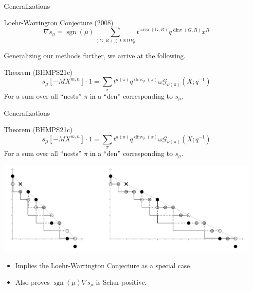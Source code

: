 \documentclass{beamer}
\DeclareMathOperator{\area}{area}
\DeclareMathOperator{\dinv}{dinv}
\newcommand{\Gcal}{\mathcal{G}}
\DeclareMathOperator{\sgn}{sgn}
\newcounter{c}
\begin{document}
\begin{frame}{Generalizations}
  \begin{block}{Loehr-Warrington Conjecture (2008)}
    \[\nabla s_\mu = \sgn(\mu)\sum_{(G,R)
        \in LNDP_\mu} t^{\area(G,R)} q^{\dinv(G,R)} x^R\]
  \end{block}\pause
  Generalizing our methods further, we arrive at the following.
  \begin{block}{Theorem (BHMPS21c)}
    \[
      s_\mu[-MX^{m,n}] \cdot 1 = \sum_\pi t^{a(\pi)} q^{\dinv_p(\pi)}
      \omega \Gcal_{\nu(\pi)}(X;q^{-1})
    \]
    For a sum over all ``nests'' \(\pi\) in a ``den'' corresponding to
    \(s_\mu\). 
  \end{block}
\end{frame}
\begin{frame}{Generalizations}
  \begin{block}{Theorem (BHMPS21c)}
    \[
      s_\mu[-MX^{m,n}] \cdot 1 = \sum_\pi t^{a(\pi)} q^{\dinv_p(\pi)}
      \omega \Gcal_{\nu(\pi)}(X;q^{-1})
    \]
    For a sum over all ``nests'' \(\pi\) in a ``den'' corresponding to
    \(s_\mu\). 
  \end{block}
  \includegraphics[scale=0.4]{images/den-examples.png}\pause
  \begin{itemize}
  \item Implies the Loehr-Warrington Conjecture as a special case.\pause
  \item Also proves \(\sgn(\mu)\nabla s_\mu\) is Schur-positive.
  \end{itemize}
\end{frame}
\end{document}
